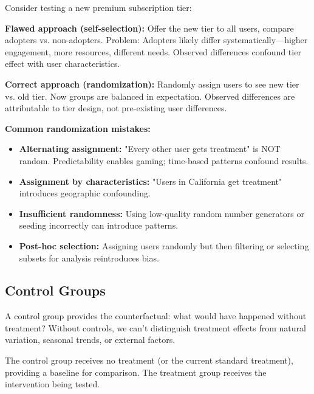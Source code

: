 \begin{example}
Consider testing a new premium subscription tier:

\textbf{Flawed approach (self-selection):} Offer the new tier to all users, compare adopters vs. non-adopters. Problem: Adopters likely differ systematically—higher engagement, more resources, different needs. Observed differences confound tier effect with user characteristics.

\textbf{Correct approach (randomization):} Randomly assign users to see new tier vs. old tier. Now groups are balanced in expectation. Observed differences are attributable to tier design, not pre-existing user differences.
\end{example}

\textbf{Common randomization mistakes:}

\begin{itemize}
    \item \textbf{Alternating assignment:} "Every other user gets treatment" is NOT random. Predictability enables gaming; time-based patterns confound results.

    \item \textbf{Assignment by characteristics:} "Users in California get treatment" introduces geographic confounding.

    \item \textbf{Insufficient randomness:} Using low-quality random number generators or seeding incorrectly can introduce patterns.

    \item \textbf{Post-hoc selection:} Assigning users randomly but then filtering or selecting subsets for analysis reintroduces bias.
\end{itemize}

\subsection{Control Groups}

A control group provides the counterfactual: what would have happened without treatment? Without controls, we can't distinguish treatment effects from natural variation, seasonal trends, or external factors.

\begin{definition}
The control group receives no treatment (or the current standard treatment), providing a baseline for comparison. The treatment group receives the intervention being tested.
\end{definition}


